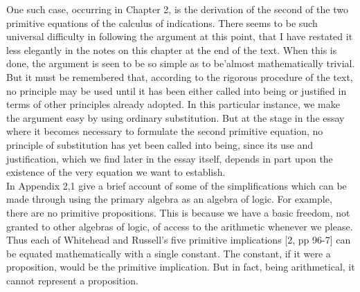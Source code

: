 \documentclass[a4paper]{article}
\theoremstyle{remark}
\begin{document}
One such case, occurring  in Chapter 2, is the derivation  of  the  second  of  the  two  primitive  equations  of the  calculus  of  indications. There  seems to be such universal  difficulty  in following  the  argument  at  this  point,  that  I  have  restated  it  less  elegantly  in  the  notes  on  this  chapter  at  the  end  of  the  text.  When   this   is  done,  the  argument  is  seen  to  be  so  simple  as  to  be'almost  mathematically  trivial. But  it must  be remembered  that,  according  to  the  rigorous  procedure  of  the  text,  no  principle  may  be  used  until  it  has  been  either  called  into  being  or  justified   in   terms  of  other  principles  already  adopted.  In  this   particular   instance,  we  make  the  argument  easy  by  using  ordinary  substitution.  But  at  the  stage  in  the  essay  where  it  becomes  necessary  to  formulate  the  second  primitive  equation,  no  principle  of  substitution  has  yet  been  called  into  being,  since  its  use  and  justification,  which  we  find  later  in  the  essay  itself,  depends  in  part upon the existence of the very equation we want to  establish.\\

In  Appendix  2,1 give a brief account  of some of the  simplifications  which  can  be  made  through  using  the  primary   algebra   as  an  algebra   of  logic.  For   example,  there  are  no   primitive   propositions.  This   is  because  we  have   a  basic  freedom,   not   granted  to  other  algebras  of  logic,  of  access  to  the  arithmetic  whenever  we please.  Thus  each  of Whitehead  and  Russell's  five  primitive implications  [2, pp 96-7] can be equated  mathematically with  a  single  constant.  The  constant,  if  it  were  a  proposition,  would  be the primitive implication. But in fact, being arithmetical, it  cannot  represent  a  proposition. \\
\end{document}

